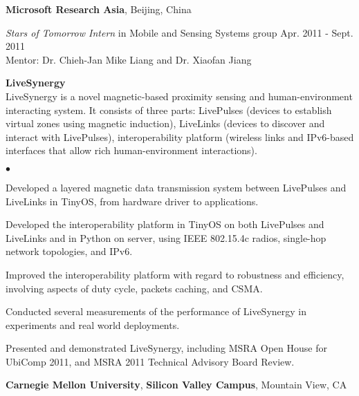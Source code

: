 \documentclass[margin,line]{res}
\newenvironment{list1}{
  \begin{list}{\ding{113}}{
      \setlength{\itemsep}{0in}
      \setlength{\parsep}{0in} \setlength{\parskip}{0in}
      \setlength{\topsep}{0in} \setlength{\partopsep}{0in}
      \setlength{\leftmargin}{0.17in}}}{\end{list}}
\newenvironment{list2}{
  \begin{list}{$\bullet$}{
      \setlength{\itemsep}{0in}
      \setlength{\parsep}{0in} \setlength{\parskip}{0in}
      \setlength{\topsep}{0in} \setlength{\partopsep}{0in}
      \setlength{\leftmargin}{0.2in}}}{\end{list}}
\begin{document}
\begin{resume}
      {\bf Microsoft Research Asia}, Beijing, China

      \vspace{-.3cm}
      {\em Stars of Tomorrow Intern} in Mobile and Sensing Systems group \hfill Apr. 2011 - Sept. 2011\\
      Mentor: Dr. Chieh-Jan Mike Liang and Dr. Xiaofan Jiang\\

      \vspace*{-.1in}
      \begin{list1}
        \item[] {\bf LiveSynergy}\\
        LiveSynergy is a novel magnetic-based proximity sensing and human-environment interacting system. It consists of three parts: LivePulses (devices to establish virtual zones using magnetic induction), LiveLinks (devices to discover and interact with LivePulses), interoperability platform (wireless links and IPv6-based interfaces that allow rich human-environment interactions).
        \vspace*{.05in}
        \begin{list2}
          \item Developed a layered magnetic data transmission system between LivePulses and LiveLinks in TinyOS, from hardware driver to applications.
          \item Developed the interoperability platform in TinyOS on both LivePulses and LiveLinks and in Python on server, using IEEE 802.15.4c radios, single-hop network topologies, and IPv6.
          \item Improved the interoperability platform with regard to robustness and efficiency, involving aspects of duty cycle, packets caching, and CSMA.
          \item Conducted several measurements of the performance of LiveSynergy in experiments and real world deployments.
          \item Presented and demonstrated LiveSynergy, including MSRA Open House for UbiComp 2011, and MSRA 2011 Technical Advisory Board Review.
        \end{list2}
      \end{list1}


      {\bf Carnegie Mellon University}, {\bf Silicon Valley Campus}, Mountain View, CA


\end{resume}
\end{document}
